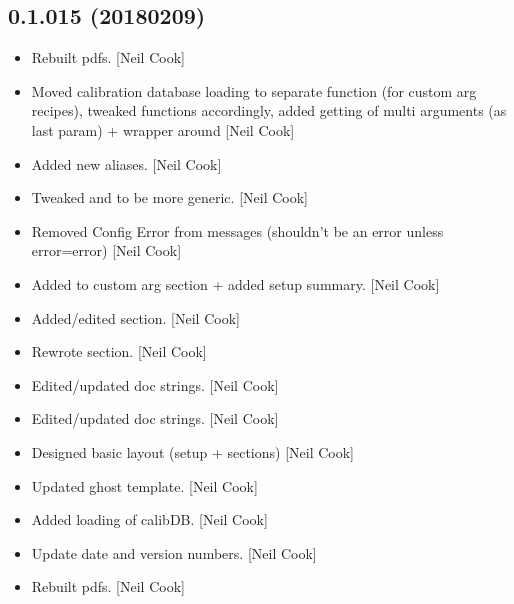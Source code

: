 \documentclass[a4paper,10pt,english]{report}
\begin{document}
\subsection{0.1.015 (2018\sphinxhyphen{}02\sphinxhyphen{}09)}
\label{\detokenize{misc/changelog:id508}}\begin{itemize}
\item {} 
Rebuilt pdfs. {[}Neil Cook{]}

\item {} 
Moved calibration database loading to separate function (for custom
arg recipes), tweaked functions accordingly, added getting of multi
arguments (as last param) + wrapper around   {[}Neil
Cook{]}

\item {} 
Added new aliases. {[}Neil Cook{]}

\item {} 
Tweaked  and  to be more generic.
{[}Neil Cook{]}

\item {} 
Removed Config Error from messages (shouldn’t be an error unless
error=error) {[}Neil Cook{]}

\item {} 
Added to custom arg section + added setup summary. {[}Neil Cook{]}

\item {} 
Added/edited section. {[}Neil Cook{]}

\item {} 
Rewrote section. {[}Neil Cook{]}

\item {} 
Edited/updated doc strings. {[}Neil Cook{]}

\item {} 
Edited/updated doc strings. {[}Neil Cook{]}

\item {} 
Designed basic layout (setup + sections) {[}Neil Cook{]}

\item {} 
Updated ghost template. {[}Neil Cook{]}

\item {} 
Added loading of calibDB. {[}Neil Cook{]}

\item {} 
Update date and version numbers. {[}Neil Cook{]}

\item {} 
Rebuilt pdfs. {[}Neil Cook{]}


\end{itemize}
\end{document}
